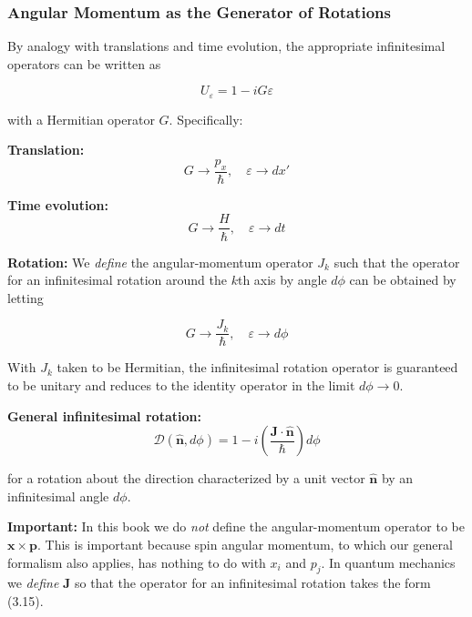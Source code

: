 \documentclass[11pt,a4paper]{article}
\begin{document}
\subsubsection{Angular Momentum as the Generator of Rotations}

By analogy with translations and time evolution, the appropriate infinitesimal operators can be written as

\begin{equation}
U_\varepsilon = 1 - iG\varepsilon
\tag{3.11}
\end{equation}

with a Hermitian operator $G$. Specifically:

\textbf{Translation:}
\begin{equation}
G \to \frac{p_x}{\hbar}, \quad \varepsilon \to dx'
\tag{3.12}
\end{equation}

\textbf{Time evolution:}
\begin{equation}
G \to \frac{H}{\hbar}, \quad \varepsilon \to dt
\tag{3.13}
\end{equation}

\textbf{Rotation:}
We \textit{define} the angular-momentum operator $J_k$ such that the operator for an infinitesimal rotation around the $k$th axis by angle $d\phi$ can be obtained by letting

\begin{equation}
G \to \frac{J_k}{\hbar}, \quad \varepsilon \to d\phi
\tag{3.14}
\end{equation}

With $J_k$ taken to be Hermitian, the infinitesimal rotation operator is guaranteed to be unitary and reduces to the identity operator in the limit $d\phi \to 0$.

\textbf{General infinitesimal rotation:}
\begin{equation}
\boxed{\mathscr{D}(\hat{\mathbf{n}}, d\phi) = 1 - i\left(\frac{\mathbf{J}\cdot\hat{\mathbf{n}}}{\hbar}\right)d\phi}
\tag{3.15}
\end{equation}

for a rotation about the direction characterized by a unit vector $\hat{\mathbf{n}}$ by an infinitesimal angle $d\phi$.

\textbf{Important:} In this book we do \textit{not} define the angular-momentum operator to be $\mathbf{x} \times \mathbf{p}$. This is important because spin angular momentum, to which our general formalism also applies, has nothing to do with $x_i$ and $p_j$. In quantum mechanics we \textit{define} $\mathbf{J}$ so that the operator for an infinitesimal rotation takes the form (3.15).
\end{document}
